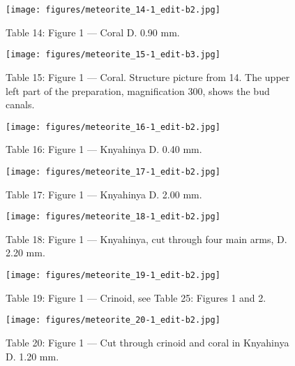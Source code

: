 \documentclass[a4paper, 12pt, oneside]{article}
\begin{document}
\clearpage
{}
\begin{figure}[t]
\texttt{[image: figures/meteorite\_14-1\_edit-b2.jpg]}
\caption{Table 14: Figure 1 --- Coral D. 0.90 mm.}
\centering
\end{figure}
\clearpage
{}
\begin{figure}[t]
\texttt{[image: figures/meteorite\_15-1\_edit-b3.jpg]}
\caption{Table 15: Figure 1 --- Coral. Structure picture from 14. The upper left part of the preparation, magnification 300, shows the bud canals.}
\centering
\end{figure}
\clearpage
{}
\begin{figure}[t]
\texttt{[image: figures/meteorite\_16-1\_edit-b2.jpg]}
\caption{Table 16: Figure 1 --- Knyahinya D. 0.40 mm.}
\centering
\end{figure}
\clearpage
{}
\begin{figure}[t]
\texttt{[image: figures/meteorite\_17-1\_edit-b2.jpg]}
\caption{Table 17: Figure 1 --- Knyahinya D. 2.00 mm.}
\centering
\end{figure}
\clearpage
{}
\begin{figure}[t]
\texttt{[image: figures/meteorite\_18-1\_edit-b2.jpg]}
\caption{Table 18: Figure 1 --- Knyahinya, cut through four main arms, D. 2.20 mm.}
\centering
\end{figure}
\clearpage
{}
\begin{figure}[t]
\texttt{[image: figures/meteorite\_19-1\_edit-b2.jpg]}
\caption{Table 19: Figure 1 --- Crinoid, see Table 25: Figures 1 and 2.}
\centering
\end{figure}
\clearpage
{}
\begin{figure}[t]
\texttt{[image: figures/meteorite\_20-1\_edit-b2.jpg]}
\caption{Table 20: Figure 1 --- Cut through crinoid and coral in Knyahinya D. 1.20 mm.}
\centering
\end{figure}
\clearpage
\end{document}
